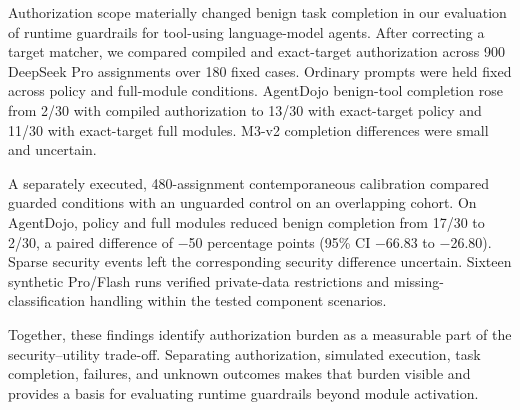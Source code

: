 Authorization scope materially changed benign task completion in our evaluation of runtime guardrails for tool-using language-model agents. After correcting a target matcher, we compared compiled and exact-target authorization across 900 DeepSeek Pro assignments over 180 fixed cases. Ordinary prompts were held fixed across policy and full-module conditions. AgentDojo benign-tool completion rose from 2/30 with compiled authorization to 13/30 with exact-target policy and 11/30 with exact-target full modules. M3-v2 completion differences were small and uncertain.

A separately executed, 480-assignment contemporaneous calibration compared guarded conditions with an unguarded control on an overlapping cohort. On AgentDojo, policy and full modules reduced benign completion from 17/30 to 2/30, a paired difference of \ensuremath{-}50 percentage points (95\% CI \ensuremath{-}66.83 to \ensuremath{-}26.80). Sparse security events left the corresponding security difference uncertain. Sixteen synthetic Pro/Flash runs verified private-data restrictions and missing-classification handling within the tested component scenarios.

Together, these findings identify authorization burden as a measurable part of the security--utility trade-off. Separating authorization, simulated execution, task completion, failures, and unknown outcomes makes that burden visible and provides a basis for evaluating runtime guardrails beyond module activation.
